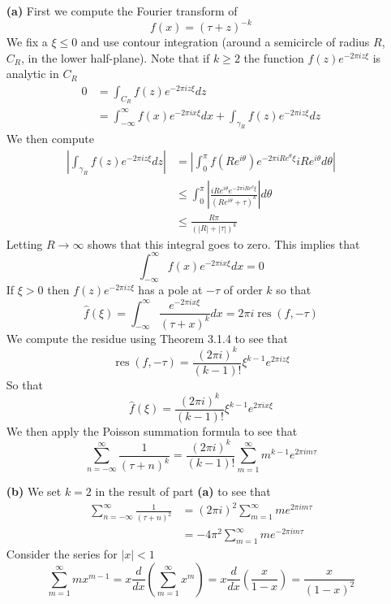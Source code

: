 \documentclass{article}
\newcommand{\exercise}[1]{\noindent{\textbf{Exercise #1:}}}
\newcommand{\res}{\operatorname{res}}
\begin{document}
\exercise{4.4.7}
\begin{enumerate}
\item[\textbf{(a)}] First we compute the Fourier transform of
  \[
  f(x) = (\tau +z)^{-k}
  \]
  We fix a $\xi \leq 0$ and use contour integration (around a
  semicircle of radius $R$, $C_R$, in the lower half-plane). Note that
  if $k \geq 2$ the function $f(z)e^{-2\pi iz\xi}$ is analytic in
  $C_R$
  \begin{align*}
    0 &= \int_{C_R} f(z)e^{-2\pi i z\xi}dz \\
    &= \int_{-\infty}^\infty f(x)e^{-2\pi ix\xi}dx +
    \int_{\gamma_R}f(z)e^{-2\pi iz\xi}dz
  \end{align*}
  We then compute
  \begin{align*}
    \left|\int_{\gamma_R}f(z)e^{-2\pi iz\xi}dz\right| &=
    \left|\int_0^\pi
      f(Re^{i\theta})e^{-2\pi iRe^{\theta}\xi}iRe^{i\theta}d\theta\right| \\
    &\leq \int_0^\pi\left|\frac{iRe^{i\theta}e^{-2\pi
        iRe^{\theta}\xi}}{(Re^{i\theta} +\tau)^k}\right|d\theta \\
    &\leq \frac{R\pi}{(|R| + |\tau|)^k}
  \end{align*}
  Letting $R \to \infty$ shows that this integral goes to zero. This
  implies that
  \[
  \int_{-\infty}^\infty f(x)e^{-2\pi ix\xi}dx = 0
  \]
  If $\xi > 0$ then $f(z)e^{-2\pi iz\xi}$ has a pole at $-\tau$ of
  order $k$ so that
  \[
  \hat{f}(\xi) = \int_{-\infty}^\infty \frac{e^{-2\pi i x\xi}}{(\tau +
    x)^k}dx = 2\pi i\res(f,-\tau)
  \]
  We compute the residue using Theorem 3.1.4 to see that
  \[
  \res(f,-\tau) = \frac{(2\pi i)^k}{(k-1)!}\xi^{k-1}e^{2\pi iz\xi}
  \]
  So that
  \[
  \hat{f}(\xi) = \frac{(2\pi i)^k}{(k-1)!}\xi^{k-1}e^{2\pi ix\xi}
  \]
  We then apply the Poisson summation formula to see that
  \[
  \sum_{n=-\infty}^\infty \frac{1}{(\tau + n)^k} = \frac{(2\pi
    i)^k}{(k-1)!}\sum_{m=1}^\infty m^{k-1}e^{2\pi im\tau}
  \]
\item[\textbf{(b)}] We set $k=2$ in the result of part \textbf{(a)} to
  see that
  \begin{align*}
    \sum_{n=-\infty}^\infty \frac{1}{(\tau + n)^2} &= (2\pi
    i)^2\sum_{m=1}^\infty me^{2\pi im\tau} \\
    &= -4\pi^2\sum_{m=1}^\infty me^{-2\pi im\tau}
  \end{align*}
  Consider the series for $|x| < 1$
  \[
  \sum_{m=1}^\infty mx^{m-1} = x\frac{d}{dx}\left(\sum_{m=1}^\infty
    x^m\right) = x \frac{d}{dx}\left(\frac{x}{1-x}\right) =
  \frac{x}{(1-x)^2}
\]
\end{enumerate}
\end{document}
